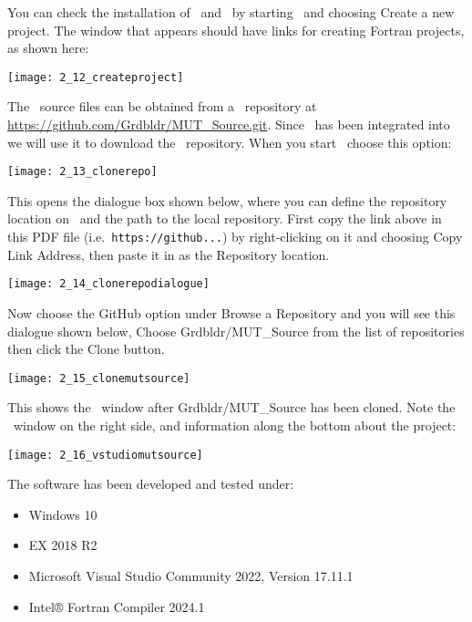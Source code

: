 You can check the installation of \vstudio\ and \ifort\ by starting \vstudio\ and choosing {\sf Create a new project}.  The window that appears should have  links for creating Fortran projects, as shown here:

\texttt{[image: 2\_12\_createproject]}

The \mut\ source files can be obtained from a \github\ repository at \url{https://github.com/Grdbldr/MUT_Source.git}.  Since \github\ has been integrated into \vstudio\, we will use it to download the \mut\ repository.  When you start \vstudio\, choose this option:

\texttt{[image: 2\_13\_clonerepo]}

This opens the dialogue box shown below, where you can define the repository location on \github\ and the path to the local repository.  First copy the link above  in this PDF file (i.e.\ {\tt https://github...}) by right-clicking on it and choosing {\sf Copy Link Address}, then paste it in as the {\sf Repository location}.

\texttt{[image: 2\_14\_clonerepodialogue]}

Now choose the {\sf GitHub} option under {\sf Browse a Repository} and you will see this dialogue shown below, Choose {\sf Grdbldr/MUT\_Source} from the list of repositories then click the {\sf Clone} button.

  \texttt{[image: 2\_15\_clonemutsource]}

This shows the \vstudio\ window after {\sf Grdbldr/MUT\_Source} has been cloned. Note the \github\ window on the right side, and information along the bottom about the project:

    \texttt{[image: 2\_16\_vstudiomutsource]}


The software has been developed and tested under:
\begin{itemize}
    \item Windows 10
    \item {} EX 2018 R2
    \item Microsoft Visual Studio Community 2022, Version 17.11.1
    \item Intel® Fortran Compiler   2024.1
\end{itemize} 